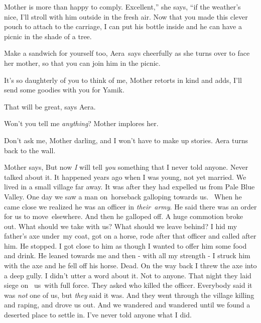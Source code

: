 \documentclass[letterpaper]{article}
\begin{document}
Mother is more than happy to comply. {\textquotedbl}Excellent,'' she says, ``if the weather's nice, I'll stroll with him
outside in the fresh air. Now that you made this clever pouch to attach to the carriage, I can put his bottle inside
and he can have a picnic in the shade of a tree.{\textquotedbl}

{\textquotedbl}Make a sandwich for yourself too,{\textquotedbl} Aera\ says cheerfully as she turns over to face her
mother, {\textquotedbl}so that you can join him in the picnic.{\textquotedbl} 

{\textquotedbl}It's so daughterly of you to think of me,{\textquotedbl} Mother retorts in kind and adds,
{\textquotedbl}I'll send some goodies with you for Yamik.{\textquotedbl}

{\textquotedbl}That will be great,{\textquotedbl} says Aera.

{\textquotedbl}Won't you tell me \textit{anything}?{\textquotedbl} Mother implores her. 

{\textquotedbl}Don't ask me, Mother darling, {\textquotedbl}and I won't have to make up stories.{\textquotedbl} Aera
turns back to the wall.\ 

Mother says, {\textquotedbl}But now \textit{I }will tell \textit{you} something that I never told anyone. Never talked
about it. It happened years ago when I was young, not yet married. We lived in a small village far away. It was after
they had expelled us from Pale Blue Valley. One day we saw a man on~horseback galloping towards us. ~When he came close
we realized he was an officer in \textit{their}\ \textit{army}. He said there was an order for us to move~elsewhere.
And then he galloped off. A huge commotion broke out. What should we take with us? What should we leave behind? I hid
my father's axe under~my coat, got on a horse, rode after that officer and called after him. He stopped. I got close to
him as though I wanted to offer him some food and drink. He leaned towards me and then {}- with all my strength -  I
struck him with the axe and he fell off his horse. Dead. On the way back I threw the axe into a deep gully. I didn't
utter a word about it. Not to anyone. That night they laid siege on \ us\ with full force. They asked who killed the
officer. Everybody said it was \textit{not} one of us, but \textit{they} said it was. And they went through the village
killing and raping, and drove us out. And we wandered and wandered until we found a deserted place to settle in. I've
never told anyone what I did.{\textquotedbl}\ 
\end{document}
